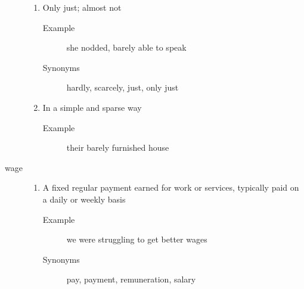 \documentclass[12pt]{article}
\begin{document}
\begin{description}
	\begin{enumerate}
	\item Only just; almost not
		\begin{description}
		\item[Example] she nodded, barely able to speak
		\item[Synonyms] hardly, scarcely, just, only just
		\end{description}
	\item In a simple and sparse way
		\begin{description}
		\item[Example] their barely furnished house
		\end{description}
	\end{enumerate}
\item[wage]
	\begin{enumerate}
	\item A fixed regular payment earned for work or services, typically paid on a daily or weekly basis
		\begin{description}
		\item[Example] we were struggling to get better wages
		\item[Synonyms] pay, payment, remuneration, salary
		\end{description}
	\end{enumerate}
\end{description}
\end{document}
